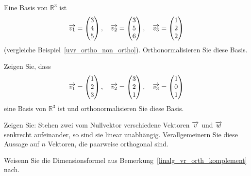 \begin{aufgabe}  Eine Basis von $\mathbb R^3$ ist 
$$ \overrightarrow{v_1} = 
\left( \begin{matrix} 3 \\ 4 \\  5
\end{matrix} \right), \quad  \overrightarrow{v_2} = \left( \begin{matrix} 3 \\ 5 \\ 6 
\end{matrix} \right), \quad \overrightarrow{v_3} = \left( \begin{matrix} 1  \\ 2 \\ 2 
\end{matrix} \right) $$
(vergleiche Beispiel~\ref{uvr_ortho_non_ortho}). Orthonormalisieren Sie diese Basis.
\end{aufgabe}

\begin{aufgabe} Zeigen Sie, dass 
$$ \overrightarrow{v_1} = 
\left( \begin{matrix} 1 \\ 2 \\  3
\end{matrix} \right), \quad  \overrightarrow{v_2} = \left( \begin{matrix} 3 \\ 2 \\ 1 
\end{matrix} \right), \quad \overrightarrow{v_3} = \left( \begin{matrix} 1  \\ 0 \\ 1 
\end{matrix} \right) $$ eine Basis von $\mathbb R^3$ ist und orthonormalisieren Sie 
diese Basis.
\end{aufgabe}

\begin{aufgabe}\label{uvr_aufg_orthogonal_lu} 
Zeigen Sie: Stehen zwei vom Nullvektor verschiedene Vektoren $\overrightarrow{v}$ und 
$\overrightarrow{w}$ senkrecht aufeinander, so sind sie linear unabhängig. 
Verallgemeinern Sie diese Aussage auf $n$ Vektoren, die paarweise orthogonal sind.
\end{aufgabe}  

\begin{aufgabe}\label{linalg_vr_orth_komplement_aufgabe} Weisenn Sie die Dimensionsformel 
aus Bemerkung~\ref{linalg_vr_orth_komplement} nach.
\end{aufgabe}

